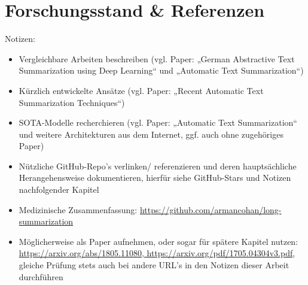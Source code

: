 \section{Forschungsstand \& Referenzen}
Notizen:
\begin{itemize}
	\item Vergleichbare Arbeiten beschreiben (vgl. Paper: „German Abstractive Text Summarization using Deep Learning“ und „Automatic Text Summarization“)
	\item Kürzlich entwickelte Ansätze (vgl. Paper: „Recent Automatic Text Summarization Techniques“)
	\item SOTA-Modelle recherchieren (vgl. Paper: „Automatic Text Summarization“ und weitere Architekturen aus dem Internet, ggf. auch ohne zugehöriges Paper)
	\item Nützliche GitHub-Repo's verlinken/ referenzieren und deren hauptsächliche Herangehensweise dokumentieren, hierfür siehe GitHub-Stars und Notizen nachfolgender Kapitel
	\item Medizinische Zusammenfassung: \url{https://github.com/armancohan/long-summarization}
	\item Möglicherweise als Paper aufnehmen, oder sogar für spätere Kapitel nutzen: \url{https://arxiv.org/abs/1805.11080, https://arxiv.org/pdf/1705.04304v3.pdf}, gleiche Prüfung stets auch bei andere URL's in den Notizen dieser Arbeit durchführen
\end{itemize}
